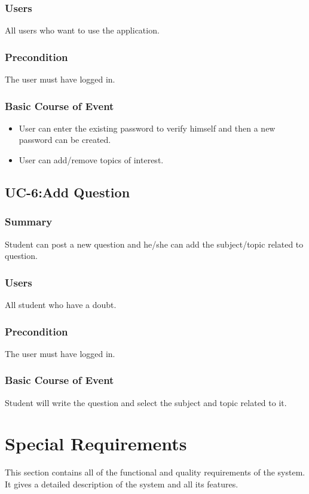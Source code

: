 \documentclass[journal,12pt,onecolumn,draftclsnofoot,]{IEEEtran}
\begin{document}
\subsubsection{Users}
All users who want to use the application.
\subsubsection{Precondition}
The user must have logged in.
\subsubsection{Basic Course of Event}
\begin{itemize}
\item User can enter the existing password to verify himself and then a new password can be created.
\item User can add/remove topics of interest.
\end{itemize}

\subsection{UC-6:Add Question}
\subsubsection{Summary}
Student can post a new question and he/she can add the subject/topic related to question.
\subsubsection{Users}
All student who have a doubt.
\subsubsection{Precondition}
The user must have logged in.
\subsubsection{Basic Course of Event}
Student will write the question and select the subject and topic related to it.

\section{Special Requirements}
This section contains all of the functional and quality requirements of the system. It gives a detailed description of the system and all its features.
\end{document}
